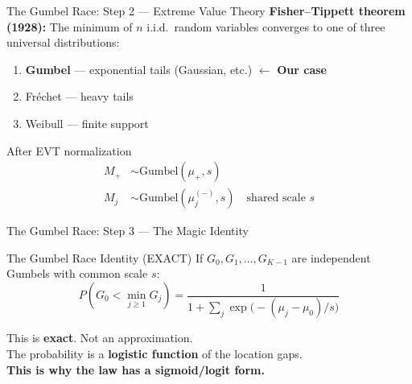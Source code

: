 \documentclass[aspectratio=169,14pt]{beamer}
\begin{document}
\begin{frame}{The Gumbel Race: Step 2 --- Extreme Value Theory}
\textbf{Fisher--Tippett theorem (1928):} The minimum of $n$ i.i.d.\ random variables converges to one of three universal distributions:

\vspace{0.3cm}
\begin{enumerate}
\item \textbf{Gumbel} --- exponential tails (Gaussian, etc.) $\leftarrow$ \textcolor{ctiblue}{\textbf{Our case}}
\item Fr\'echet --- heavy tails
\item Weibull --- finite support
\end{enumerate}

\vspace{0.3cm}
\begin{block}{After EVT normalization}
\begin{align*}
M_+ &\sim \mathrm{Gumbel}(\mu_+, s) \\
M_j &\sim \mathrm{Gumbel}(\mu_j^{(-)}, s) \quad \text{shared scale } s
\end{align*}
\end{block}
\end{frame}

\begin{frame}{The Gumbel Race: Step 3 --- The Magic Identity}
\begin{block}{The Gumbel Race Identity (EXACT)}
If $G_0, G_1, \ldots, G_{K-1}$ are independent Gumbels with common scale $s$:
\[
\boxed{P(G_0 < \min_{j \geq 1} G_j) = \frac{1}{1 + \sum_{j} \exp\!\bigl(-(\mu_j - \mu_0)/s\bigr)}}
\]
\end{block}

\vspace{0.5cm}
\begin{center}
\large
This is \textbf{exact}. Not an approximation.\\[0.3cm]
The probability is a \textbf{logistic function} of the location gaps.\\[0.3cm]
\textcolor{ctiblue}{\textbf{This is why the law has a sigmoid/logit form.}}
\end{center}
\end{frame}
\end{document}
